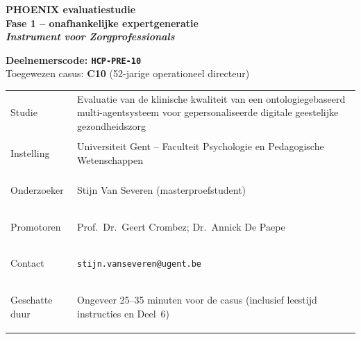 \documentclass[11pt,a4paper]{article}
\renewcommand{\arraystretch}{1.28}
\begin{document}
\thispagestyle{fancy}
\vspace*{0.3cm}

\begin{tcolorbox}[
  colback=DarkBlue,colframe=DarkBlue,
  arc=3mm,left=14pt,right=14pt,top=12pt,bottom=12pt,
  width=\textwidth
]
\centering
{\fontsize{22}{28}\selectfont\bfseries\color{white}
PHOENIX evaluatiestudie\\[0.3em]
\fontsize{15}{20}\selectfont\color{AccentBlue}
Fase 1 -- onafhankelijke expertgeneratie\\[0.2em]
\fontsize{12}{16}\selectfont\color{white}
\textit{Instrument voor Zorgprofessionals}
}
\end{tcolorbox}

\vspace{0.6cm}

\begin{center}
\begin{tcolorbox}[
  colback=AccentBlue,colframe=PrimaryBlue,
  arc=2.5mm,boxrule=1.2pt,left=12pt,right=12pt,top=10pt,bottom=10pt,
  width=0.86\textwidth
]
\centering
{\large\bfseries\color{DarkBlue}Deelnemerscode: \texttt{HCP-PRE-10}}\\[0.5em]
{\normalsize\color{SlateMid}
Toegewezen casus:\quad
\textbf{\color{PrimaryBlue}C10} (52-jarige operationeel directeur)
}
\end{tcolorbox}
\end{center}

\vspace{0.5cm}

\begin{center}
\begin{tcolorbox}[
  colback=SoftBG,colframe=BorderGrey,
  arc=2mm,left=10pt,right=10pt,top=9pt,bottom=9pt,
  width=0.92\textwidth
]
\small\renewcommand{\arraystretch}{1.28}
\begin{tabularx}{\textwidth}{@{}>{\bfseries\raggedright\arraybackslash}p{}X@{}}
Studie & Evaluatie van de klinische kwaliteit van een ontologiegebaseerd multi-agentsysteem voor gepersonaliseerde digitale geestelijke gezondheidszorg \\
Instelling & Universiteit Gent -- Faculteit Psychologie en Pedagogische Wetenschappen \\
Onderzoeker & Stijn Van Severen (masterproefstudent) \\
Promotoren & Prof.\ Dr.\ Geert Crombez; Dr.\ Annick De Paepe \\
Contact & \texttt{stijn.vanseveren@ugent.be} \\
Geschatte duur & Ongeveer 25--35 minuten voor de casus (inclusief leestijd instructies en Deel~6) \\
\end{tabularx}
\end{tcolorbox}
\end{center}
\end{document}
